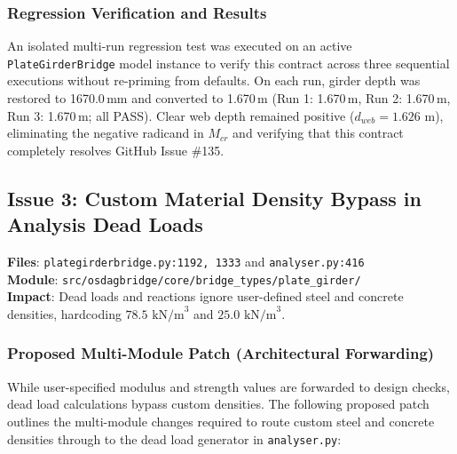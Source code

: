 \documentclass[11pt,a4paper]{article}
\begin{document}
\subsubsection*{Regression Verification and Results}
An isolated multi-run regression test was executed on an active \texttt{PlateGirderBridge} model instance to verify this contract across three sequential executions without re-priming from defaults. On each run, girder depth was restored to 1670.0\,mm and converted to 1.670\,m (Run 1: 1.670\,m, Run 2: 1.670\,m, Run 3: 1.670\,m; all PASS). Clear web depth remained positive ($d_{web} = 1.626\text{ m}$), eliminating the negative radicand in $M_{cr}$ and verifying that this contract completely resolves GitHub Issue \#135.

\newpage
\subsection{Issue 3: Custom Material Density Bypass in Analysis Dead Loads}
\begin{tcolorbox}[colback=red!5!white,colframe=red!75!black,title=\textbf{Bug Summary: Dead Load Pipeline Ignores Custom Densities}]
\textbf{Files}: \texttt{plategirderbridge.py:1192, 1333} and \texttt{analyser.py:416} \\
\textbf{Module}: \texttt{src/osdagbridge/core/bridge\_types/plate\_girder/} \\
\textbf{Impact}: Dead loads and reactions ignore user-defined steel and concrete densities, hardcoding $78.5\text{ kN/m}^3$ and $25.0\text{ kN/m}^3$.
\end{tcolorbox}

\subsubsection*{Proposed Multi-Module Patch (Architectural Forwarding)}
While user-specified modulus and strength values are forwarded to design checks, dead load calculations bypass custom densities. The following proposed patch outlines the multi-module changes required to route custom steel and concrete densities through to the dead load generator in \texttt{analyser.py}:
\end{document}
